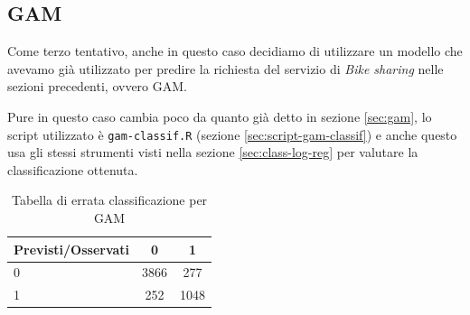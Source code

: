 \subsection{GAM}\label{sec:class-gam}

Come terzo tentativo, anche in questo caso decidiamo di utilizzare un modello
che avevamo già utilizzato per predire la richiesta del servizio di \emph{Bike sharing} nelle sezioni precedenti, ovvero GAM.

Pure in questo caso cambia poco da quanto già detto in sezione \ref{sec:gam},
lo script utilizzato è \texttt{gam-classif.R} (sezione
\ref{sec:script-gam-classif}) e anche questo usa gli stessi strumenti visti
nella sezione \ref{sec:class-log-reg} per valutare la classificazione ottenuta.

\begin{table}[H]
\begin{center}
\begin{tabular}{ | l || c | c | }
  \hline
    Previsti/Osservati & 0 & 1 \\ \hline \hline
    0 & 3866 & 277 \\ \hline
    1 & 252 & 1048 \\ \hline
\end{tabular}
  \caption{Tabella di errata classificazione per GAM}
\end{center}
\end{table}

